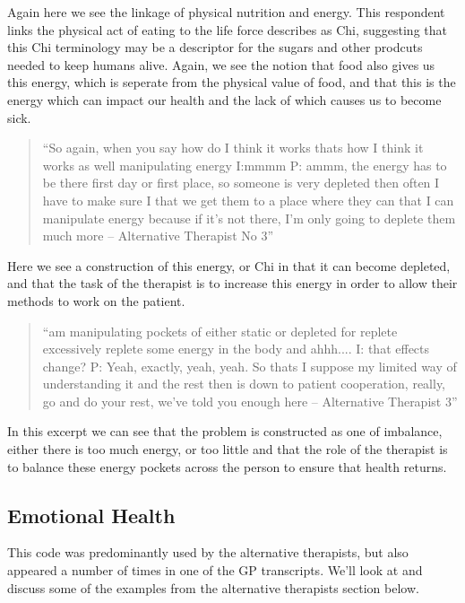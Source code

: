 Again here we see the linkage of physical nutrition and energy. This respondent links the physical act of eating to the life force describes as Chi, suggesting that this Chi terminology may be a descriptor for the sugars and other prodcuts needed to keep humans alive. Again, we see the notion that food also gives us this energy, which is seperate from the physical value of food, and that this is the energy which can impact our health and the lack of which causes us to become sick. 


\begin{quotation}
``So again, when you say how do I think it works thats how I think it works as well manipulating energy
I:mmmm
P: ammm, the energy has to be there first day or first place, so someone is very depleted then often I have to make sure I that we get them to a place where they can that I can manipulate energy because if it's not there, I'm only going to deplete them much more – Alternative Therapist No 3''  
\end{quotation}


Here we see a construction of this energy, or Chi in that it can become depleted, and that the task of the therapist is to increase this energy in order to allow their methods to work on the patient. 

\begin{quotation}
``am manipulating pockets of either static or depleted for replete excessively replete some energy in the body and ahhh....
I: that effects change?
P: Yeah, exactly, yeah, yeah. So thats I suppose my limited way of understanding it and the rest then is down to patient cooperation, really, go and do your rest, we've told you enough here – Alternative Therapist 3''  
\end{quotation}


In this excerpt we can see that the problem is constructed as one of imbalance, either there is too much energy, or too little and that the role of the therapist is to balance these energy pockets across the person to ensure that health returns. 



\subsection{Emotional Health}

This code was predominantly used by the alternative therapists, but also appeared a number of times in one of the GP transcripts. We'll look at and discuss some of the examples from the alternative therapists section below. 

